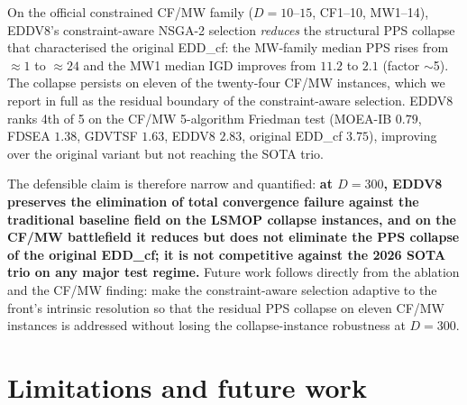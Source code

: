 \documentclass[preprint,12pt]{elsarticle}
\begin{document}
On the official constrained CF/MW family ($D = 10$--$15$, CF1--10,
MW1--14), EDDV8's constraint-aware NSGA-2 selection \emph{reduces} the
structural PPS collapse that characterised the original EDD\_cf: the
MW-family median PPS rises from $\approx 1$ to $\approx 24$ and the MW1
median IGD improves from $11.2$ to $2.1$ (factor $\sim$5). The collapse
persists on eleven of the twenty-four CF/MW instances, which we report
in full as the residual boundary of the constraint-aware selection. EDDV8
ranks 4th of 5 on the CF/MW 5-algorithm Friedman test (MOEA-IB $0.79$,
FDSEA $1.38$, GDVTSF $1.63$, EDDV8 $2.83$, original EDD\_cf $3.75$),
improving over the original variant but not reaching the SOTA trio.

The defensible claim is therefore narrow and quantified: \textbf{at
$D = 300$, EDDV8 preserves the elimination of total convergence failure
against the traditional baseline field on the LSMOP collapse instances,
and on the CF/MW battlefield it reduces but does not eliminate the
PPS collapse of the original EDD\_cf; it is not competitive against the
2026 SOTA trio on any major test regime.} Future work follows directly
from the ablation and the CF/MW finding: make the constraint-aware
selection adaptive to the front's intrinsic resolution so that the
residual PPS collapse on eleven CF/MW instances is addressed without
losing the collapse-instance robustness at $D = 300$.

\section*{Limitations and future work}
\end{document}
